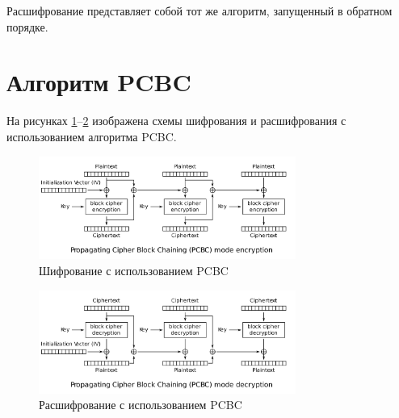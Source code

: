 Расшифрование представляет собой тот же алгоритм, запущенный в обратном порядке.

\newpage

\section{Алгоритм PCBC}

На рисунках \ref{fig:pcbc_enc.png}--\ref{fig:pcbc_dec.png} изображена схемы шифрования и расшифрования с использованием алгоритма PCBC.

\begin{figure}[h!]
\centering
\includegraphics[width=0.75\textwidth]{assets/pcbc_enc.png}
\caption{Шифрование с использованием PCBC}
\label{fig:pcbc_enc.png}
\end{figure}

\begin{figure}[h!]
\centering
\includegraphics[width=0.75\textwidth]{assets/pcbc_dec.png}
\caption{Расшифрование с использованием PCBC}
\label{fig:pcbc_dec.png}
\end{figure}

